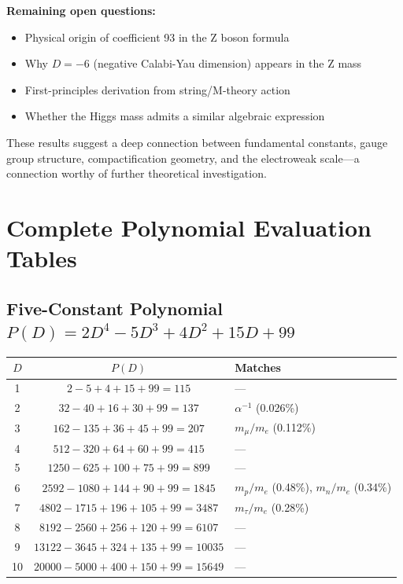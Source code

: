 \documentclass[11pt,a4paper]{article}
\begin{document}
\textbf{Remaining open questions:}
\begin{itemize}
    \item Physical origin of coefficient 93 in the Z boson formula
    \item Why $D = -6$ (negative Calabi-Yau dimension) appears in the Z mass
    \item First-principles derivation from string/M-theory action
    \item Whether the Higgs mass admits a similar algebraic expression
\end{itemize}

These results suggest a deep connection between fundamental constants, gauge group structure, compactification geometry, and the electroweak scale---a connection worthy of further theoretical investigation.

\appendix

\section{Complete Polynomial Evaluation Tables}

\subsection{Five-Constant Polynomial $P(D) = 2D^4 - 5D^3 + 4D^2 + 15D + 99$}

\begin{center}
\begin{longtable}{ccl}
\hline
$D$ & $P(D)$ & Matches \\
\hline
\endhead
1 & $2 - 5 + 4 + 15 + 99 = 115$ & --- \\
2 & $32 - 40 + 16 + 30 + 99 = 137$ & $\alpha^{-1}$ (0.026\%) \\
3 & $162 - 135 + 36 + 45 + 99 = 207$ & $m_\mu/m_e$ (0.112\%) \\
4 & $512 - 320 + 64 + 60 + 99 = 415$ & --- \\
5 & $1250 - 625 + 100 + 75 + 99 = 899$ & --- \\
6 & $2592 - 1080 + 144 + 90 + 99 = 1845$ & $m_p/m_e$ (0.48\%), $m_n/m_e$ (0.34\%) \\
7 & $4802 - 1715 + 196 + 105 + 99 = 3487$ & $m_\tau/m_e$ (0.28\%) \\
8 & $8192 - 2560 + 256 + 120 + 99 = 6107$ & --- \\
9 & $13122 - 3645 + 324 + 135 + 99 = 10035$ & --- \\
10 & $20000 - 5000 + 400 + 150 + 99 = 15649$ & --- \\
\hline
\end{longtable}
\end{center}
\end{document}
